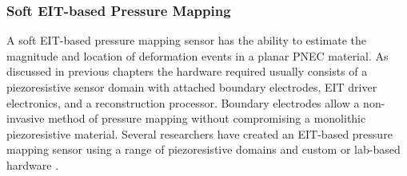 \subsubsection{Soft EIT-based Pressure Mapping}
\label{subsubsec:eit-based_pressure_mapping}
A soft EIT-based pressure mapping sensor has the ability to estimate the magnitude and location of deformation events in a planar PNEC material. As discussed in previous chapters the hardware required usually consists of a piezoresistive sensor domain with attached boundary electrodes, EIT driver electronics, and a reconstruction processor. Boundary electrodes allow a non-invasive method of pressure mapping without compromising a monolithic piezoresistive material. Several researchers have created an EIT-based pressure mapping sensor using a range of piezoresistive domains and custom or lab-based hardware \cite{Russo2017, Nagakubo2007, Silvera-Tawil2015, Yoon2017, Sun2020, Ellingham2024} .

